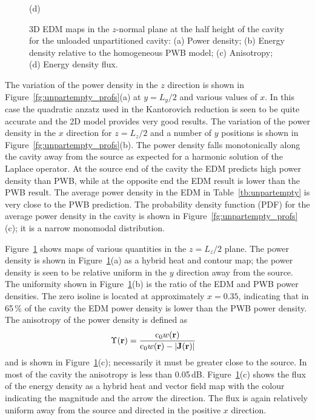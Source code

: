 \documentclass[a4paper]{article}
\numberwithin{equation}{section}
\newcounter{Table}
\newcounter{Figure}
\begin{document}
\begin{figure}[hp]
\begin{center}
{\footnotesize (d)}\\
\vspace{-2mm}
\caption{\label{fg:unpartempty_maps} 3D EDM maps in the $z$-normal plane at the half height of the cavity for the 
unloaded unpartitioned cavity: (a) Power density; (b) Energy density relative to the homogeneous PWB model;
(c) Anisotropy; (d) Energy density flux.}
\end{center}
\end{figure}

The variation of the power density in the $z$ direction is shown in Figure~\ref{fg:unpartempty_profs}(a)
at $y=L_y/2$ and various values of $x$. In this case the quadratic anzatz used in the Kantorovich reduction
is seen to be quite accurate and the 2D model provides very good results. The variation of the power density 
in the $x$ direction for $z=L_z/2$ and a number of $y$ positions is shown in Figure~\ref{fg:unpartempty_profs}(b).
The power density falls monotonically along the cavity away from the source as expected for a harmonic solution
of the Laplace operator. At the source end of the cavity the EDM predicts high power density than PWB, while 
at the opposite end the EDM result is lower than the PWB result. The average power density in the EDM in 
Table~\ref{tb:unpartempty} is very close to the PWB prediction. The probability density function (PDF)
for the average power density in the cavity is shown in Figure~\ref{fg:unpartempty_profs}(c); it is a narrow
monomodal distribution.

Figure~\ref{fg:unpartempty_maps} shows maps of various quantities in the $z=L_z/2$ plane. The power density is
shown in Figure~\ref{fg:unpartempty_maps}(a) as a hybrid heat and contour map; the power density is seen to
be relative uniform in the $y$ direction away from the source. The uniformity shown in Figure~\ref{fg:unpartempty_maps}(b)
is the ratio of the EDM and PWB power densities. The zero isoline is located at approximately $x=0.35$, indicating that in 65\,\% of 
the cavity the EDM power density is lower than the PWB power density. The anisotropy of the power density is defined as 
\begin{align}
\Upsilon(\boldsymbol{\mathrm{r}}) &= \frac{\mathrm{c}_0 w(\boldsymbol{\mathrm{r}})}{\mathrm{c}_0 w(\boldsymbol{\mathrm{r}}) - |\boldsymbol{\mathrm{J}}(\boldsymbol{\mathrm{r}})|} 
\end{align}
and is shown in Figure~\ref{fg:unpartempty_maps}(c); necessarily it must be greater close to the source. In most of the 
cavity the anisotropy is less than 0.05\,dB. Figure~\ref{fg:unpartempty_maps}(c) shows the flux of the energy density 
as a hybrid heat and vector
field map with the colour indicating the magnitude and the arrow the direction. The flux is again relatively uniform away from 
the source and directed in the positive $x$ direction. 
\end{document}
